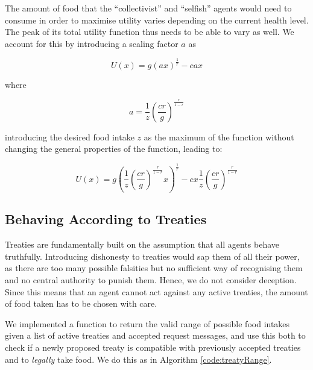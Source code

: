 The amount of food that the “collectivist” and “selfish” agents would need to consume in order to maximise utility varies depending on the current health level. The peak of its total utility function thus needs to be able to vary as well. We account for this by introducing a scaling factor $a$ as

\begin{equation}
    U(x)=g(ax)^\frac{1}{r}-cax
\end{equation}

where

\begin{equation}
    a=\frac{1}{z}\left(\frac{cr}{g}\right)^\frac{r}{1-r}
\end{equation}

introducing the desired food intake $z$ as the maximum of the function without changing the general properties of the function, leading to:

\begin{equation}
U\left(x\right)=g\left(\frac{1}{z}\left(\frac{cr}{g}\right)^{\frac{r}{1-r}}x\right)^{\frac{1}{r}}-cx\frac{1}{z}\left(\frac{cr}{g}\right)^{\frac{r}{1-r}}    
\end{equation}
\subsection{Behaving According to Treaties}

Treaties are fundamentally built on the assumption that all agents behave truthfully. Introducing dishonesty to treaties would sap them of all their power, as there are too many possible falsities but no sufficient way of recognising them and no central authority to punish them. Hence, we do not consider deception. Since this means that an agent cannot act against any active treaties, the amount of food taken has to be chosen with care.

We implemented a function to return the valid range of possible food intakes given a list of active treaties and accepted request messages, and use this both to check if a newly proposed treaty is compatible with previously accepted treaties and to \textit{legally} take food. We do this as in Algorithm \ref{code:treatyRange}.

